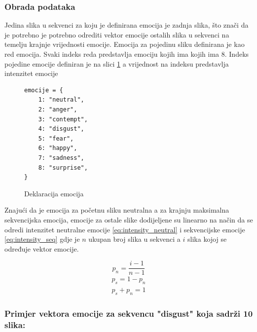 \documentclass[times, utf8, zavrsni,numeric,pstricks]{fer}
\begin{document}
\subsubsection{Obrada podataka}
Jedina slika u sekvenci za koju je definirana emocija je zadnja slika, što znači da je potrebno je potrebno odrediti vektor emocije ostalih slika u sekvenci na temelju krajnje vrijednosti emocije. Emocija za pojedinu sliku definirana je kao red emocija. Svaki indeks reda predstavlja emociju kojih ima kojih ima 8. Indeks pojedine emocije definiran je na slici \ref{cb:emo_declare} a vrijednost na indeksu predstavlja intenzitet emocije

\begin{figure}[H]
\centering
\begin{Verbatim}[fontsize=\small]
emocije = {
    1: "neutral",
    2: "anger",
    3: "contempt",
    4: "disgust",
    5: "fear",
    6: "happy",
    7: "sadness",
    8: "surprise",
}
\end{Verbatim}
\caption{Deklaracija emocija}
\label{cb:emo_declare}
\end{figure}

\noindent
Znajući da je emocija za početnu sliku neutralna a za krajnju maksimalna sekvencijska emocija, emocije za ostale slike dodijeljene su linearno na način da se odredi intenzitet neutralne emocije \ref{eq:intensity_neutral} i sekvencijske emocije \ref{eq:intensity_seq} gdje je $n$ ukupan broj slika u sekvenci a $i$ slika kojoj se određuje vektor emocije.

\begin{equation}\label{eq:intensity_neutral}
	p_{n} = \dfrac{i-1}{n-1}	
\end{equation}
\begin{equation}\label{eq:intensity_seq}
\begin{split}
	p_{s} = 1 - p_{n}\\
	p_{s} + p_{n} = 1	
\end{split}
\end{equation}

\subsubsection{Primjer vektora emocije za sekvencu "disgust" koja sadrži 10 slika:}
\end{document}
